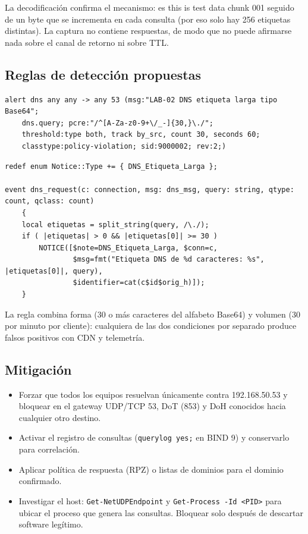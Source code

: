 La decodificación confirma el mecanismo: \texttt{} es \guillemotleft{}this is test data chunk 001\guillemotright{} seguido de un byte que se incrementa en cada consulta (por eso solo hay 256 etiquetas distintas). La captura no contiene respuestas, de modo que no puede afirmarse nada sobre el canal de retorno ni sobre TTL.

\subsection{Reglas de detección propuestas}

\begin{lstlisting}
alert dns any any -> any 53 (msg:"LAB-02 DNS etiqueta larga tipo Base64";
    dns.query; pcre:"/^[A-Za-z0-9+\/_-]{30,}\./";
    threshold:type both, track by_src, count 30, seconds 60;
    classtype:policy-violation; sid:9000002; rev:2;)
\end{lstlisting}

\begin{lstlisting}
redef enum Notice::Type += { DNS_Etiqueta_Larga };

event dns_request(c: connection, msg: dns_msg, query: string, qtype: count, qclass: count)
    {
    local etiquetas = split_string(query, /\./);
    if ( |etiquetas| > 0 && |etiquetas[0]| >= 30 )
        NOTICE([$note=DNS_Etiqueta_Larga, $conn=c,
                $msg=fmt("Etiqueta DNS de %d caracteres: %s", |etiquetas[0]|, query),
                $identifier=cat(c$id$orig_h)]);
    }
\end{lstlisting}

La regla combina forma (30 o más caracteres del alfabeto Base64) y volumen (30 por minuto por cliente): cualquiera de las dos condiciones por separado produce falsos positivos con CDN y telemetría.

\subsection{Mitigación}

\begin{itemize}
  \item Forzar que todos los equipos resuelvan únicamente contra 192.168.50.53 y bloquear en el gateway UDP/TCP 53, DoT (853) y DoH conocidos hacia cualquier otro destino.
  \item Activar el registro de consultas (\texttt{querylog yes;} en BIND 9) y conservarlo para correlación.
  \item Aplicar política de respuesta (RPZ) o listas de dominios para el dominio confirmado.
  \item Investigar el host: \texttt{Get-NetUDPEndpoint} y \texttt{Get-Process -Id <PID>} para ubicar el proceso que genera las consultas. Bloquear solo después de descartar software legítimo.
\end{itemize}

